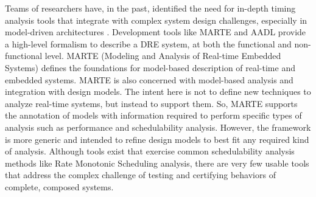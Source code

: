 Teams of researchers have, in the past, identified the need for in-depth timing analysis tools that integrate with complex system design challenges, especially in model-driven architectures \cite{kordon_sn}. Development tools like MARTE \cite{MARTE:05} and AADL \cite{AADL_Intro:06} provide a high-level formalism to describe a DRE system, at both the functional and non-functional level. MARTE (Modeling and Analysis of Real-time Embedded Systems) defines the foundations for model-based description of real-time and embedded systems. MARTE is also concerned with model-based analysis and integration with design models. The intent here is not to define new techniques to analyze real-time systems, but instead to support them. So, MARTE supports the annotation of models with information required to perform specific types of analysis such as performance and schedulability analysis. However, the framework is more generic and intended to refine design models to best fit any required kind of analysis. Although tools exist that exercise common schedulability analysis methods like Rate Monotonic Scheduling analysis, there are very few usable tools that address the complex challenge of testing and certifying behaviors of complete, composed systems. 


\vspace{-0.1in}